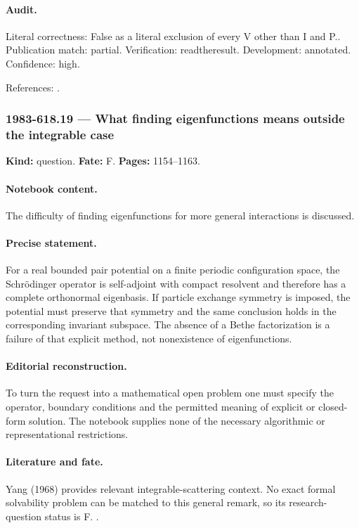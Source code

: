 \paragraph{Audit.} Literal correctness: False as a literal exclusion of every V other than I and P.. Publication match: partial. Verification: readtheresult. Development: annotated. Confidence: high.

\noindent References: \citep{yang1967manybody}.\par

\subsubsection{1983-618.19 --- What finding eigenfunctions means outside the integrable case}

\label{item:1983-618.19}

\noindent\textbf{Kind:} question. \textbf{Fate:} F. \textbf{Pages:} 1154--1163.\par

\paragraph{Notebook content.} The difficulty of finding eigenfunctions for more general interactions is discussed.

\paragraph{Precise statement.} For a real bounded pair potential on a finite periodic configuration space, the Schrödinger operator is self-adjoint with compact resolvent and therefore has a complete orthonormal eigenbasis. If particle exchange symmetry is imposed, the potential must preserve that symmetry and the same conclusion holds in the corresponding invariant subspace. The absence of a Bethe factorization is a failure of that explicit method, not nonexistence of eigenfunctions.

\paragraph{Editorial reconstruction.} To turn the request into a mathematical open problem one must specify the operator, boundary conditions and the permitted meaning of explicit or closed-form solution. The notebook supplies none of the necessary algorithmic or representational restrictions.

\paragraph{Literature and fate.} Yang (1968) provides relevant integrable-scattering context. No exact formal solvability problem can be matched to this general remark, so its research-question status is F. \citep{yang1968smatrix}.

